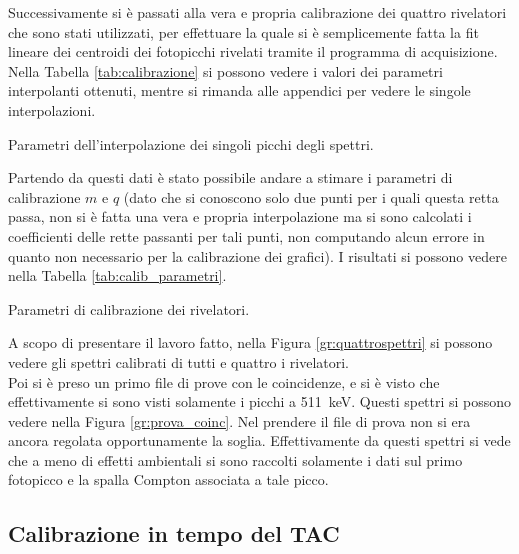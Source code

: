 Successivamente si è passati alla vera e propria calibrazione dei quattro rivelatori che sono stati utilizzati, per effettuare la quale si è semplicemente fatta la fit
lineare dei centroidi dei fotopicchi rivelati tramite il programma di acquisizione. Nella Tabella \ref{tab:calibrazione} si possono vedere i valori dei parametri interpolanti
ottenuti, mentre si rimanda alle appendici per vedere le singole interpolazioni.\\
%
\begin{table}[h]
	\centering
	
	\caption{Parametri dell'interpolazione dei singoli picchi degli spettri.}
	\label{tab:calibrazione}
\end{table}
%

Partendo da questi dati è stato possibile andare a stimare i parametri di calibrazione $m$ e $q$ (dato che si conoscono solo due punti per i quali questa retta passa,
non si è fatta una vera e propria interpolazione ma si sono calcolati i coefficienti delle rette passanti per tali punti, non computando alcun errore in quanto non necessario per la calibrazione dei grafici). I risultati si possono vedere nella Tabella \ref{tab:calib_parametri}.\\
%
\begin{table}[h]
	\centering
	
	\caption{Parametri di calibrazione dei rivelatori.}
	\label{tab:calib_parametri}
\end{table}
%

A scopo di presentare il lavoro fatto, nella Figura \ref{gr:quattrospettri} si possono vedere gli spettri calibrati di tutti e quattro i
rivelatori.\\


Poi si è preso un primo file di prove con le coincidenze, e si è visto che effettivamente si sono visti solamente i picchi a 511~keV. Questi spettri si possono
vedere nella Figura \ref{gr:prova_coinc}. Nel prendere il file di prova non si era ancora regolata opportunamente la soglia. Effettivamente da questi spettri si vede che a meno di effetti ambientali si sono raccolti solamente i dati sul
primo fotopicco e la spalla Compton associata a tale picco.\\

\FloatBarrier

\subsection{Calibrazione in tempo del TAC}

